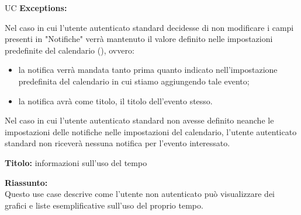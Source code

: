 \begin{listaPersonale}{UC}
    \textbf{Exceptions:}
    \begin{enumerate}[label=\textbf{[exception \arabic{enumii}]}, ref= \textbf{[exception \arabic{enumii}]}]
         Nel caso in cui l'utente autenticato standard decidesse di non modificare i campi presenti in "Notifiche" verrà mantenuto il valore definito nelle impostazioni predefinite del calendario (), ovvero:
        \begin{itemize}
            \item la notifica verrà mandata tanto prima quanto indicato nell'impostazione predefinita del calendario in cui stiamo aggiungendo tale evento;
            \item la notifica avrà come titolo, il titolo dell'evento stesso.
        \end{itemize}
         Nel caso in cui l'utente autenticato standard non avesse definito neanche le impostazioni delle notifiche nelle impostazioni del calendario, l'utente autenticato standard non riceverà nessuna notifica per l'evento interessato.
    \end{enumerate}









    \newpage


    \begin{center}
        
    \end{center}

    \textbf{Titolo:} informazioni sull'uso del tempo

    \textbf{Riassunto:} \\
    Questo use case descrive come l'utente non autenticato può visualizzare dei grafici e liste esemplificative sull'uso del proprio tempo.


\end{listaPersonale}
